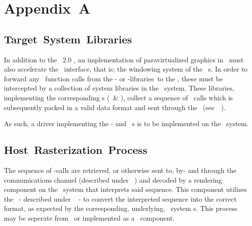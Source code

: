 
\chapter*{Appendix~A}
\label{cha:appendixa}

\section*{Target~System~Libraries}
\label{sec:appendixa_guestsystemlibraries}

In addition to the \termopengles ~$2.0$ \termapi , an implementation of paravirtualized graphics in \termsimics\ must also accelerate the \termegl\ interface, that is; the windowing system of the \termopengl\ \termapi s.
In order to forward any \termapi\ function calls from the \termopengles - or \termegl-libraries\ to the \termhost, these must be intercepted by a collection of system libraries in the \termtarget\ system.
These libraries, implementing the corresponding \termabi s (\termopengles\ \& \termegl), collect a sequence of \termapi\ calls which is subsequently packed in a valid data format and sent through the \termsimicspipe\ (see~\termsec ~).

As such, a driver implementing the \termopengl - and \termegl\ \termabi s is to be implemented on the \termtarget\ system.

\section*{Host~Rasterization~Process}
\label{sec:appendixa_hostrastterizationprocess}

The sequence of \termapi -calls are retrieved, or otherwise sent to, by- and through the communications channel (described under \termsec ~) and decoded by a rendering component on the \termhost\ system that interprets said sequence.
This component utilizes the \termhosttranslatorlibraries\ - described under \termsec ~ - to convert the interpreted sequence into the correct format, as expected by the corresponding, underlying, \termhost\ system \termabi s.
This process may be seperate from \termsimics\ or implemented as a \termsimics ~component.

